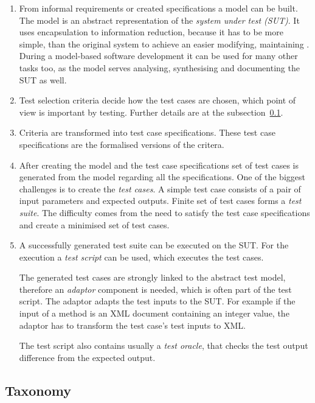 \documentclass{article}
\begin{document}
\begin{enumerate}
    \item From informal requirements or created specifications a model can be built. The model is an abstract representation of the \textit{system under test (SUT)}. It uses encapsulation to information reduction, because it has to be more simple, than the original system to achieve an easier modifying, maintaining \cite{mbttestcasegeneration}. During a model-based software development it can be used for many other tasks too, as the model serves analysing, synthesising and documenting the SUT as well.
     \item Test selection criteria decide how the test cases are chosen, which point of view is important by testing. Further details are at the subsection~\ref{sub:taxonomy}.
     \item Criteria are transformed into test case specifications. These test case specifications are the formalised versions of the critera.
     \item After creating the model and the test case specifications set of test cases is generated from the model regarding all the specifications. One of the biggest challenges is to create the \textit{test cases}. A simple test case consists of a pair of input parameters and expected outputs. Finite set of test cases forms a \textit{test suite}. The difficulty comes from the need to satisfy the test case specifications and create a minimised set of test cases.
     \item A successfully generated test suite can be executed on the SUT. For the execution a \textit{test script} can be used, which executes the test cases.
     
     The generated test cases are strongly linked to the abstract test model, therefore an \textit{adaptor} component is needed, which is often part of the test script. The adaptor adapts the test inputs to the SUT. For example if the input of a method is an XML document containing an integer value, the adaptor has to transform the test case's test inputs to XML.
     
     The test script also contains usually a \textit{test oracle}, that checks the test output difference from the expected output.
\end{enumerate}

\subsection{Taxonomy}
\label{sub:taxonomy}
\end{document}
